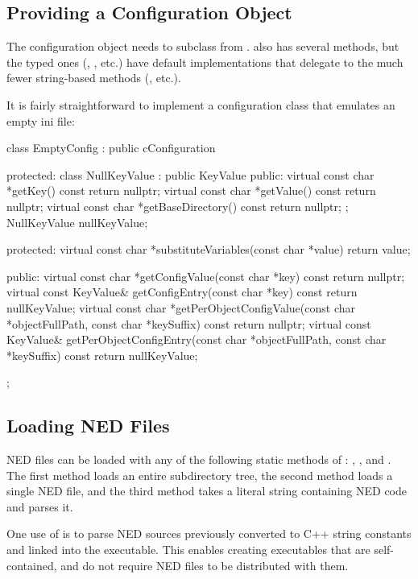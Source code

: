 \subsection{Providing a Configuration Object}
\label{sec:embedding:providing-a-configuration-object}

The configuration object needs to subclass from .
 also has several methods, but the typed ones
(, , etc.) have default implementations
that delegate to the much fewer string-based methods (, etc.).

It is fairly straightforward to implement a configuration class that
emulates an empty ini file:

\begin{cpp}
class EmptyConfig : public cConfiguration
{
  protected:
    class NullKeyValue : public KeyValue {
      public:
        virtual const char *getKey() const {return nullptr;}
        virtual const char *getValue() const {return nullptr;}
        virtual const char *getBaseDirectory() const {return nullptr;}
    };
    NullKeyValue nullKeyValue;

  protected:
    virtual const char *substituteVariables(const char *value) {return value;}

  public:
    virtual const char *getConfigValue(const char *key) const
        {return nullptr;}
    virtual const KeyValue& getConfigEntry(const char *key) const
        {return nullKeyValue;}
    virtual const char *getPerObjectConfigValue(const char *objectFullPath,
        const char *keySuffix) const {return nullptr;}
    virtual const KeyValue& getPerObjectConfigEntry(const char *objectFullPath,
        const char *keySuffix) const {return nullKeyValue;}
};
\end{cpp}


\subsection{Loading NED Files}
\label{sec:embedding:loading-ned-files}

NED files can be loaded with any of the following static methods of
: , ,
and . The first method loads an entire subdirectory tree,
the second method loads a single NED file, and the third method takes a literal
string containing NED code and parses it.

\begin{note}
One use of  is to parse NED sources previously converted
to C++ string constants and linked into the executable. This enables
creating executables that are self-contained, and do not require NED files
to be distributed with them.
\end{note}

